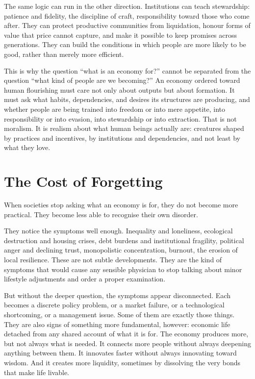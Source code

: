 \documentclass[11pt,a4paper,oneside]{book}
\begin{document}
The same logic can run in the other direction. Institutions can teach stewardship: patience and fidelity, the discipline of craft, responsibility toward those who come after. They can protect productive communities from liquidation, honour forms of value that price cannot capture, and make it possible to keep promises across generations. They can build the conditions in which people are more likely to be good, rather than merely more efficient.

This is why the question ``what is an economy for?'' cannot be separated from the question ``what kind of people are we becoming?'' An economy ordered toward human flourishing must care not only about outputs but about formation. It must ask what habits, dependencies, and desires its structures are producing, and whether people are being trained into freedom or into mere appetite, into responsibility or into evasion, into stewardship or into extraction. That is not moralism. It is realism about what human beings actually are: creatures shaped by practices and incentives, by institutions and dependencies, and not least by what they love.

\section*{The Cost of Forgetting}

When societies stop asking what an economy is for, they do not become more practical. They become less able to recognise their own disorder.

They notice the symptoms well enough. Inequality and loneliness, ecological destruction and housing crises, debt burdens and institutional fragility, political anger and declining trust, monopolistic concentration, burnout, the erosion of local resilience. These are not subtle developments. They are the kind of symptoms that would cause any sensible physician to stop talking about minor lifestyle adjustments and order a proper examination.

But without the deeper question, the symptoms appear disconnected. Each becomes a discrete policy problem, or a market failure, or a technological shortcoming, or a management issue. Some of them are exactly those things. They are also signs of something more fundamental, however: economic life detached from any shared account of what it is for. The economy produces more, but not always what is needed. It connects more people without always deepening anything between them. It innovates faster without always innovating toward wisdom. And it creates more liquidity, sometimes by dissolving the very bonds that make life livable.
\end{document}
